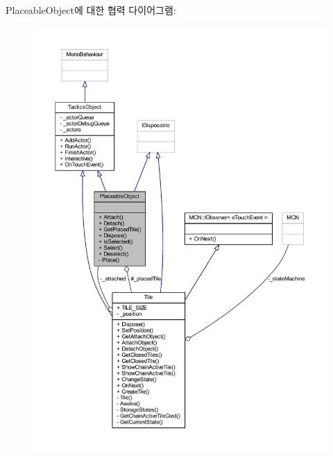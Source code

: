 Placeable\+Object에 대한 협력 다이어그램\+:\nopagebreak
\begin{figure}[H]
\begin{center}
\leavevmode
\includegraphics[width=350pt]{class_placeable_object__coll__graph}
\end{center}
\end{figure}
